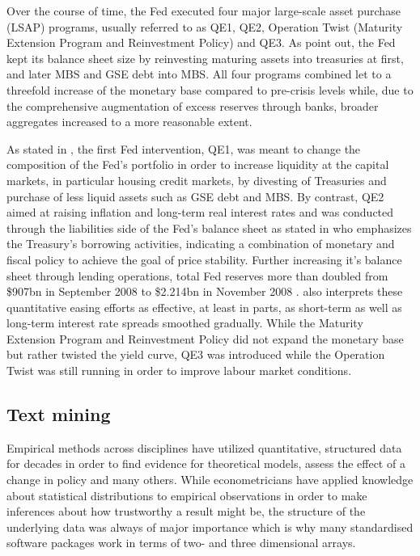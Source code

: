 Over the course of time, the Fed executed four major large-scale asset purchase (LSAP) programs, usually referred to as QE1, QE2, Operation Twist (Maturity Extension Program and
Reinvestment Policy) and QE3. As \textcite{Fawley.2013} point out, the Fed kept its balance sheet size by reinvesting maturing assets into treasuries at first, and later MBS and GSE debt into MBS. All four programs combined let to a threefold increase of the monetary base compared to pre-crisis levels while, due to the comprehensive augmentation of excess reserves through banks, broader aggregates increased to a more reasonable extent. 

As stated in \textcite{Blinder.2010}, the first Fed intervention, QE1, was meant to change the composition of the Fed's portfolio in order to increase liquidity at the capital markets, in particular housing credit markets, by divesting of Treasuries and purchase of less liquid assets such as GSE debt and MBS. %
By contrast, QE2 aimed at raising inflation and long-term real interest rates and was conducted through the liabilities side of the Fed's balance sheet as stated in \textcite{Blinder.2010} who emphasizes the Treasury's borrowing activities, indicating a combination of monetary and fiscal policy to achieve the goal of price stability. Further increasing it's balance sheet through lending operations, total Fed reserves more than doubled from \$907bn in September 2008 to \$2.214bn in November 2008 \parencite[p.~468]{Blinder.2010}. \textcite{Blinder.2010} also interprets these quantitative easing efforts as effective, at least in parts, as short-term as well as long-term interest rate spreads smoothed gradually.
While the Maturity Extension Program and Reinvestment Policy did not expand the monetary base but rather twisted the yield curve, QE3 was introduced while the Operation Twist was still running in order to improve labour market conditions.

%
\subsection{Text mining}

Empirical methods across disciplines have utilized quantitative, structured data for decades in order to find evidence for theoretical models, assess the effect of a change in policy and many others. While econometricians have applied knowledge about statistical distributions to empirical observations in order to make inferences about how trustworthy a result might be, the structure of the underlying data was always of major importance which is why many standardised software packages work in terms of two- and three dimensional arrays. 

